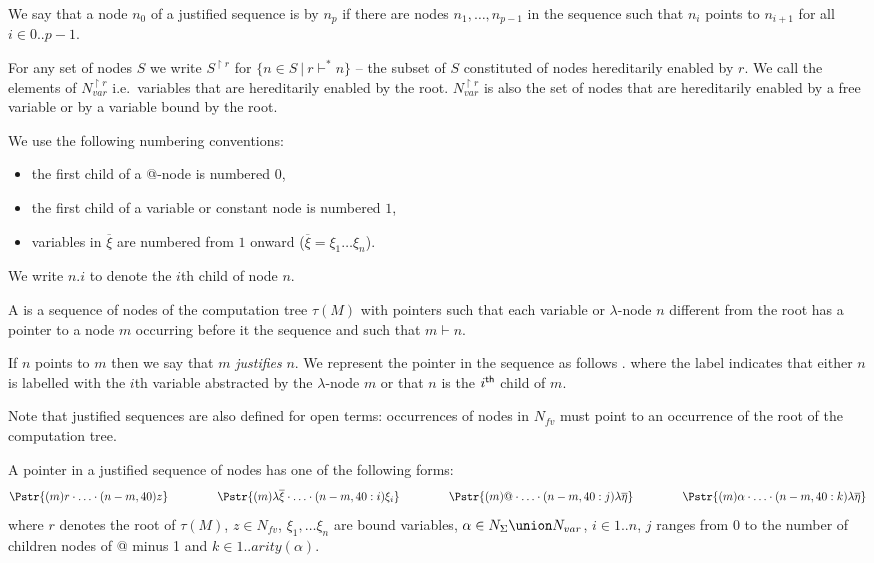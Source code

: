 We say that a node $n_0$ of a justified sequence is
 by $n_p$ if there are nodes $n_1,
\ldots, n_{p-1}$ in the sequence such that $n_i$ points to $n_{i+1}$
for all $i\in 0..p-1$.

For any set of nodes $S$ we write $S^{\upharpoonright r}$ for $\{ n \in S \ | \ r  \vdash^* n \}$ -- the subset of $S$ constituted of
nodes hereditarily enabled by $r$.
We call  the elements of $N_{var}^{\upharpoonright r}$ i.e.\
variables that are hereditarily enabled by the root. $N_{var}^{\upharpoonright r}$ is also the set of nodes that are hereditarily enabled by a free variable or by a variable bound by the root.
\smallskip

We use the following numbering conventions:
\begin{itemize}[-]
\item the first child of a @-node is numbered $0$,
\item the first child of a variable or constant node is numbered $1$,
\item variables in $\overline{\xi}$ are numbered from $1$ onward ($\overline{\xi} = \xi_1 \ldots \xi_n$).
\end{itemize}
We write $n.i$ to denote the $i$th child of node $n$.

\begin{definition}
A  is a sequence of nodes of
the computation tree $\tau(M)$ with pointers such that each variable
or $\lambda$-node $n$ different from the root has a pointer to a
node $m$ occurring before it the sequence and such that $m \vdash
n$.

If $n$ points to $m$ then we say that $m$ \emph{justifies} $n$. We
represent the pointer in the sequence as follows . where the label indicates that either
$n$ is labelled with the $i$th variable abstracted by the
$\lambda$-node $m$ or that $n$ is the $i^{\sf th}$ child of $m$.
\end{definition}

Note that justified sequences are also defined for open terms:
occurrences of nodes in $N_{fv}$ must point to an occurrence of the
root of the computation tree.

A pointer in a justified sequence of nodes has
one of the following forms: \vspace{2pt}
$$
\Pstr{ (m){r} \cdot \ldots \cdot (n-m,40){z} }
\hspace{1.5cm}
\Pstr{ (m){\lambda \overline{\xi}} \cdot \ldots \cdot (n-m,40:i){\xi_i} }
\hspace{1.5cm}
\Pstr{ (m){@} \cdot \ldots \cdot (n-m,40:j){\lambda \overline{\eta}} }
\hspace{1.5cm}
\Pstr{ (m){\alpha } \cdot \ldots \cdot (n-m,40:k){\lambda \overline{\eta}} }
$$
where $r$ denotes the root of $\tau(M)$, $z \in N_{fv}$, $\xi_1,
\ldots \xi_n$ are bound variables, $\alpha \in N_{\Sigma} \union
N_{var}$, $i \in 1..n$, $j$ ranges from $0$ to the number of
children nodes of @ minus 1 and $k \in 1 ..arity(\alpha)$.


